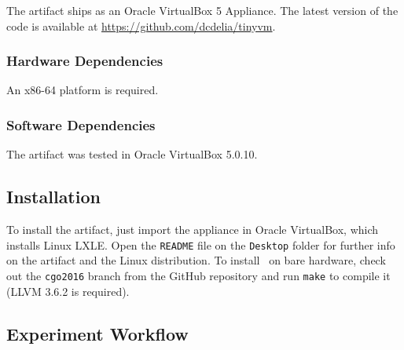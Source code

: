 The artifact ships as an Oracle VirtualBox 5 Appliance.
The latest version of the code is available at \url{https://github.com/dcdelia/tinyvm}.

\subsubsection{Hardware Dependencies}

An x86-64 platform is required.

\subsubsection{Software Dependencies}

The artifact was tested in Oracle VirtualBox 5.0.10. 


\subsection{Installation}

To install the artifact, just import the appliance in Oracle VirtualBox, which installs Linux LXLE. Open the {\tt README} file on the {\tt Desktop} folder for further info on the artifact and the Linux distribution. To install \tinyvm\ on bare hardware, check out the {\tt cgo2016} branch from the GitHub repository and run {\tt make} to compile it (LLVM 3.6.2 is required).

\subsection{Experiment Workflow}

